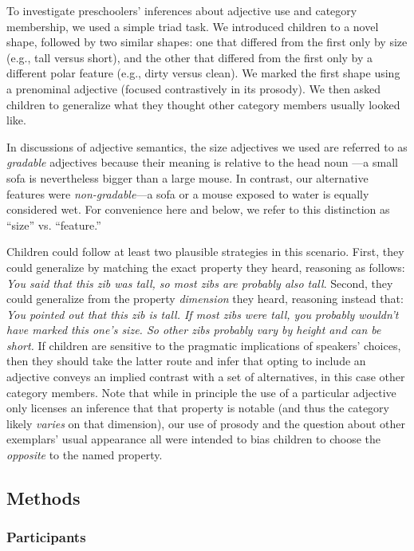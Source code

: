 \documentclass[man]{apa2}
\begin{document}
To investigate preschoolers' inferences about adjective use and category membership, we used a simple triad task.  We introduced children to a novel shape, followed by two similar shapes: one that differed from the first only by size (e.g., tall versus short), and the other that differed from the first only by a different polar feature (e.g., dirty versus clean). We marked the first shape using a prenominal adjective (focused contrastively in its prosody). We then asked children to generalize what they thought other category members usually looked like.  

In discussions of adjective semantics, the size adjectives we used are referred to as \emph{gradable} adjectives because their meaning is relative to the head noun \cite{kennedy2012}---a small sofa is nevertheless bigger than a large mouse. In contrast, our alternative features were \emph{non-gradable}---a sofa or a mouse exposed to water is equally considered wet. For convenience here and below, we refer to this distinction as ``size'' vs. ``feature.'' 

Children could follow at least two plausible strategies in this scenario. First, they could generalize by matching the exact property they heard, reasoning as follows: \emph{You said that this zib was tall, so most zibs are probably also tall}. Second, they could generalize from the property \emph{dimension} they heard, reasoning instead that: \emph{You pointed out that this zib is tall. If most zibs were tall, you probably wouldn't have marked this one's size. So other zibs probably vary by height and can be short.} If children are sensitive to the pragmatic implications of speakers' choices, then they should take the latter route and infer that opting to include an adjective conveys an implied contrast with a set of alternatives, in this case other category members. Note that while in principle the use of a particular adjective only licenses an inference that that property is notable (and thus the category likely \emph{varies} on that dimension), our use of prosody and the question about other exemplars' usual appearance all were intended to bias children to choose the \emph{opposite} to the named property.

\subsection{Methods}

\subsubsection{Participants}
\end{document}
